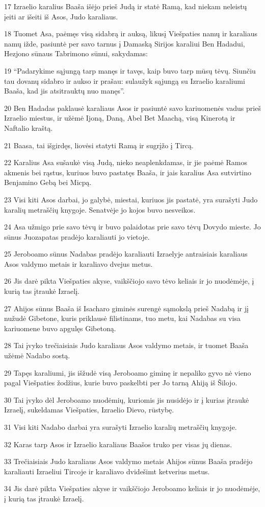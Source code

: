 \par 17 Izraelio karalius Baaša išėjo prieš Judą ir statė Ramą, kad niekam neleistų įeiti ar išeiti iš Asos, Judo karaliaus. 
\par 18 Tuomet Asa, paėmęs visą sidabrą ir auksą, likusį Viešpaties namų ir karaliaus namų ižde, pasiuntė per savo tarnus į Damaską Sirijos karaliui Ben Hadadui, Hezjono sūnaus Tabrimono sūnui, sakydamas: 
\par 19 “Padarykime sąjungą tarp manęs ir tavęs, kaip buvo tarp mūsų tėvų. Siunčiu tau dovanų sidabro ir aukso ir prašau: sulaužyk sąjungą su Izraelio karaliumi Baaša, kad jis atsitrauktų nuo manęs”. 
\par 20 Ben Hadadas paklausė karaliaus Asos ir pasiuntė savo kariuomenės vadus prieš Izraelio miestus, ir užėmė Ijoną, Daną, Abel Bet Maachą, visą Kinerotą ir Naftalio kraštą. 
\par 21 Baasa, tai išgirdęs, liovėsi statyti Ramą ir sugrįžo į Tircą. 
\par 22 Karalius Asa sušaukė visą Judą, nieko neaplenkdamas, ir jie paėmė Ramos akmenis bei rąstus, kuriuos buvo pastatęs Baaša, ir jais karalius Asa sutvirtino Benjamino Gebą bei Micpą. 
\par 23 Visi kiti Asos darbai, jo galybė, miestai, kuriuos jis pastatė, yra surašyti Judo karalių metraščių knygoje. Senatvėje jo kojos buvo nesveikos. 
\par 24 Asa užmigo prie savo tėvų ir buvo palaidotas prie savo tėvų Dovydo mieste. Jo sūnus Juozapatas pradėjo karaliauti jo vietoje. 
\par 25 Jeroboamo sūnus Nadabas pradėjo karaliauti Izraelyje antraisiais karaliaus Asos valdymo metais ir karaliavo dvejus metus. 
\par 26 Jis darė pikta Viešpaties akyse, vaikščiojo savo tėvo keliais ir jo nuodėmėje, į kurią tas įtraukė Izraelį. 
\par 27 Ahijos sūnus Baaša iš Isacharo giminės surengė sąmokslą prieš Nadabą ir jį nužudė Gibetone, kuris priklausė filistinams, tuo metu, kai Nadabas su visa kariuomene buvo apgulęs Gibetoną. 
\par 28 Tai įvyko trečiaisiais Judo karaliaus Asos valdymo metais, ir tuomet Baaša užėmė Nadabo sostą. 
\par 29 Tapęs karaliumi, jis išžudė visą Jeroboamo giminę ir nepaliko gyvo nė vieno pagal Viešpaties žodžius, kurie buvo paskelbti per Jo tarną Ahiją iš Šilojo. 
\par 30 Tai įvyko dėl Jeroboamo nuodėmių, kuriomis jis nusidėjo ir į kurias įtraukė Izraelį, sukeldamas Viešpaties, Izraelio Dievo, rūstybę. 
\par 31 Visi kiti Nadabo darbai yra surašyti Izraelio karalių metraščių knygoje. 
\par 32 Karas tarp Asos ir Izraelio karaliaus Baašos truko per visas jų dienas. 
\par 33 Trečiaisiais Judo karaliaus Asos valdymo metais Ahijos sūnus Baaša pradėjo karaliauti Izraeliui Tircoje ir karaliavo dvidešimt ketverius metus. 
\par 34 Jis darė pikta Viešpaties akyse ir vaikščiojo Jeroboamo keliais ir jo nuodėmėje, į kurią tas įtraukė Izraelį.



